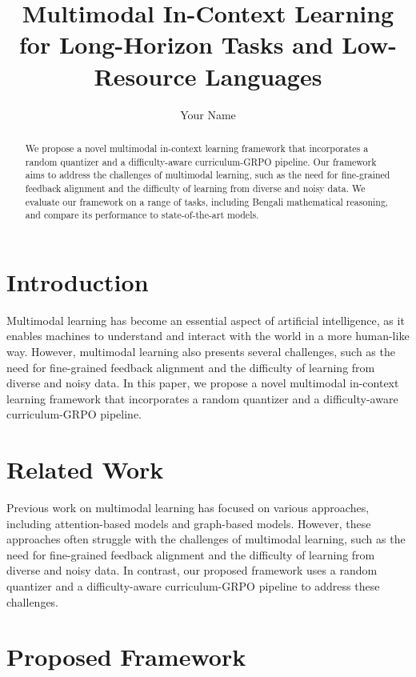 \documentclass{article}
\begin{document}
\title{Multimodal In-Context Learning for Long-Horizon Tasks and Low-Resource Languages}

\author{Your Name}

\maketitle

\begin{abstract}
We propose a novel multimodal in-context learning framework that incorporates a random quantizer and a difficulty-aware curriculum-GRPO pipeline. Our framework aims to address the challenges of multimodal learning, such as the need for fine-grained feedback alignment and the difficulty of learning from diverse and noisy data. We evaluate our framework on a range of tasks, including Bengali mathematical reasoning, and compare its performance to state-of-the-art models.
\end{abstract}

\section{Introduction}

Multimodal learning has become an essential aspect of artificial intelligence, as it enables machines to understand and interact with the world in a more human-like way. However, multimodal learning also presents several challenges, such as the need for fine-grained feedback alignment and the difficulty of learning from diverse and noisy data. In this paper, we propose a novel multimodal in-context learning framework that incorporates a random quantizer and a difficulty-aware curriculum-GRPO pipeline.

\section{Related Work}

Previous work on multimodal learning has focused on various approaches, including attention-based models and graph-based models. However, these approaches often struggle with the challenges of multimodal learning, such as the need for fine-grained feedback alignment and the difficulty of learning from diverse and noisy data. In contrast, our proposed framework uses a random quantizer and a difficulty-aware curriculum-GRPO pipeline to address these challenges.

\section{Proposed Framework}
\end{document}
